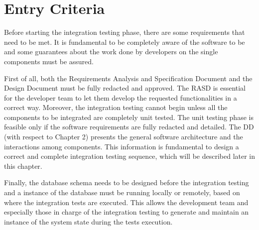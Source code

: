 
\section{Entry Criteria}
Before starting the integration testing phase, there are some requirements that need to be met. It is fundamental to be completely aware of the software to be and some guarantees about the work done by developers on the single components must be assured.

First of all, both the Requirements Analysis and Specification Document \cite{rasd} and the Design Document \cite{dd} must be fully redacted and approved. The RASD is essential for the developer team to let them develop the requested functionalities in a correct way. Moreover, the integration testing cannot begin unless all the components to be integrated are completely unit tested. The unit testing phase is feasible only if the software requirements are fully redacted and detailed. The DD (with respect to Chapter 2) presents the general software architecture and the interactions among components. This information is fundamental to design a correct and complete integration testing sequence, which will be described later in this chapter.

Finally, the database schema needs to be designed before the integration testing and a instance of the database must be running locally or remotely, based on where the integration tests are executed. This allows the development team and especially those in charge of the integration testing to generate and maintain an instance of the system state during the tests execution.
